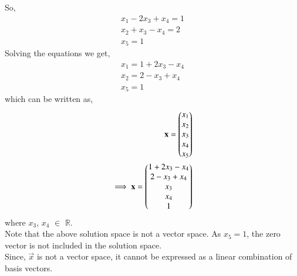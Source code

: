 \documentclass[journal,12pt,twocolumn]{IEEEtran}
\begin{document}
So,
\begin{align}
x_1-2x_3+x_4=1\\
x_2+x_3-x_4=2\\
x_5=1
\end{align}
Solving the equations we get,
\begin{align}
x_1=1+2x_3-x_4\\
x_2=2-x_3+x_4\\
x_5=1
\end{align}
which can be written as,
   \begin{align}
   \mathbf{x} = \begin{pmatrix}x_1\\x_2\\x_3 \\ x_4 \\ x_5\end{pmatrix}\\
   \implies \mathbf{x}=\begin{pmatrix}1+2x_3-x_4\\2-x_3+x_4\\x_3\\x_4\\1\end{pmatrix}
\end{align}
where $x_3$, $x_4$ $\in$ $\mathbb{R}$.\\
Note that the above solution space is not a vector space. As $x_5=1$, the zero vector is not included in the solution space.\\
Since, $\vec{x}$ is not a vector space, it cannot be expressed as a linear combination of basis vectors.
\end{document}
